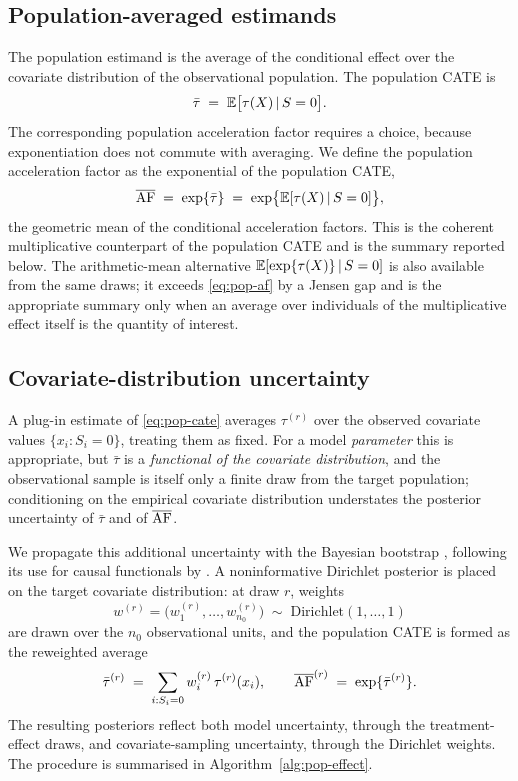 \subsection{Population-averaged estimands}

The population estimand is the average of the conditional effect over the
covariate distribution of the observational population. The population CATE is
\begin{equation}
\label{eq:pop-cate}
\bar\tau \;=\; \mathbb{E}\bigl[\tau(X) \,\vert\, S = 0\bigr].
\end{equation}
The corresponding population acceleration factor requires a choice, because
exponentiation does not commute with averaging. We define the population
acceleration factor as the exponential of the population CATE,
\begin{equation}
\label{eq:pop-af}
\overline{\mathrm{AF}} \;=\; \exp\{\bar\tau\}
              \;=\; \exp\bigl\{\mathbb{E}[\tau(X)\,\vert\, S=0]\bigr\},
\end{equation}
the geometric mean of the conditional acceleration factors. This is the coherent
multiplicative counterpart of the population CATE and is the summary reported
below. The arithmetic-mean alternative $\mathbb{E}[\exp\{\tau(X)\}\,\vert\, S=0]$ is also
available from the same draws; it exceeds \eqref{eq:pop-af} by a Jensen gap and
is the appropriate summary only when an average over individuals of the
multiplicative effect itself is the quantity of interest.

\subsection{Covariate-distribution uncertainty}

A plug-in estimate of \eqref{eq:pop-cate} averages $\tau^{(r)}$ over the observed
covariate values $\{x_i : S_i = 0\}$, treating them as fixed. For a model
\emph{parameter} this is appropriate, but $\bar\tau$ is a \emph{functional of the
covariate distribution}, and the observational sample is itself only a finite
draw from the target population; conditioning on the empirical covariate
distribution understates the posterior uncertainty of $\bar\tau$ and of
$\overline{\mathrm{AF}}$.

We propagate this additional uncertainty with the Bayesian bootstrap
\citep{rubin1981}, following its use for causal functionals by
\citet{antonelli2019}. A noninformative Dirichlet posterior is placed on the
target covariate distribution: at draw $r$, weights
\[
w^{(r)} = \bigl(w_1^{(r)}, \dots, w_{n_0}^{(r)}\bigr)
\;\sim\; \mathrm{Dirichlet}(1, \dots, 1)
\]
are drawn over the $n_0$ observational units, and the population CATE is formed
as the reweighted average
\begin{equation}
\label{eq:bb-cate}
\bar\tau^{(r)} \;=\; \sum_{i : S_i = 0} w_i^{(r)}\, \tau^{(r)}(x_i),
\qquad
\overline{\mathrm{AF}}^{(r)} \;=\; \exp\{\bar\tau^{(r)}\}.
\end{equation}
The resulting posteriors reflect both model uncertainty, through the
treatment-effect draws, and covariate-sampling uncertainty, through the
Dirichlet weights. The procedure is summarised in
Algorithm~\ref{alg:pop-effect}.

